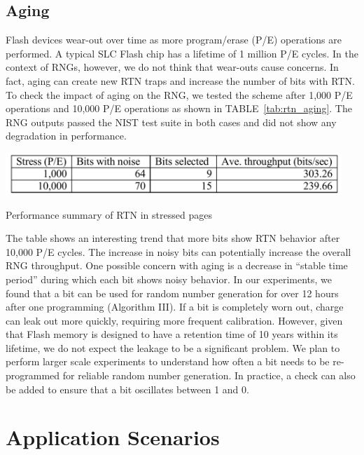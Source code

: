 \subsection{Aging}

Flash devices wear-out over time as more program/erase (P/E) operations are performed. A typical SLC Flash chip has a lifetime of 1 million P/E cycles. In the context of RNGs, however, we do not think that wear-outs cause concerns. In fact, aging can create new RTN traps and increase the number of bits with RTN. To check the impact of aging on the RNG, we tested the scheme after 1,000 P/E operations and 10,000 P/E operations as shown in TABLE~\ref{tab:rtn_aging}. The RNG outputs passed the NIST test suite in both cases and did not show any degradation in performance. 

\begin{table}
  \begin{center}
    \includegraphics[width=5in]{figs/rtn_aging.png} 
  \end{center}
\caption{Performance summary of RTN in stressed pages}
\vspace{-0.2in}
\label{tab:rtn_aging}
\end{table}

The table shows an interesting trend that more bits show RTN behavior after 10,000 P/E cycles. The increase in noisy bits can potentially increase the overall RNG throughput. One possible concern with aging is a decrease in “stable time period” during which each bit shows noisy behavior. In our experiments, we found that a bit can be used for random number generation for over 12 hours after one programming (Algorithm III). If a bit is completely worn out, charge can leak out more quickly, requiring more frequent calibration. However, given that Flash memory is designed to have a retention time of 10 years within its lifetime, we do not expect the leakage to be a significant problem. We plan to perform larger scale experiments to understand how often a bit needs to be re-programmed for reliable random number generation. In practice, a check can also be added to ensure that a bit oscillates between 1 and 0. 

\section{Application Scenarios}

